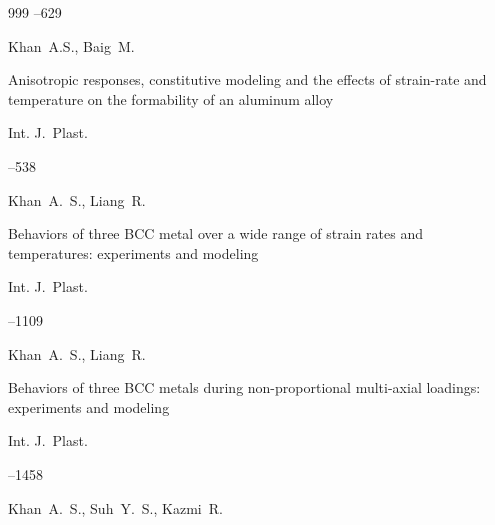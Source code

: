 \begin{thebibliography}{999}
--629






\by Khan~A.S., Baig~M. 

\paper Anisotropic responses, constitutive modeling and the effects of strain-rate and temperature on the formability of an aluminum alloy

\jour Int. J.~Plast.  




--538






\by Khan~A.~S., Liang~R.


\paper Behaviors of three BCC metal over a wide range of strain rates and temperatures: experiments and modeling

\jour Int. J.~Plast. 



–1109






\by Khan~A.~S., Liang~R.


\paper Behaviors of three BCC metals during non-proportional multi-axial loadings: experiments and modeling



\jour  Int. J.~Plast. 

–1458






\by Khan~A.~S., Suh~Y.~S., Kazmi~R.


\end{thebibliography}
